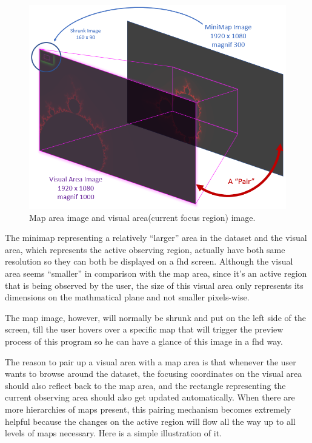\begin{figure}[th]
\centering
\includegraphics[width=\textwidth,keepaspectratio]{Figures/Chapter4/mapvisualpair.png}
\decoRule
\caption[Map Visual Pair]{Map area image and visual area(current focus region) image.}
\label{fig:mapvisualpair}
\end{figure}

The minimap representing a relatively ``larger'' area in the dataset and the visual area, which represents the active observing region, actually have both same resolution so they can both be displayed on a \gls{fhd} screen. Although the visual area seems ``smaller'' in comparison with the \gls{map} area, since it's an active region that is being observed by the user, the size of this visual area only represents its dimensions on the mathmatical plane and not smaller pixels-wise.

The \gls{map} image, however, will normally be shrunk and put on the left side of the screen, till the user hovers over a specific \gls{map} that will trigger the preview process of this program so he can have a glance of this image in a \gls{fhd} way.

The reason to pair up a visual area with a \gls{map} area is that whenever the user wants to browse around the dataset, the focusing coordinates on the visual area should also reflect back to the \gls{map} area, and the rectangle representing the current observing area should also get updated automatically. When there are more hierarchies of \glspl{map} present, this pairing mechanism becomes extremely helpful because the changes on the active region will flow all the way up to all levels of \glspl{map} necessary. Here  is a simple illustration of it.


